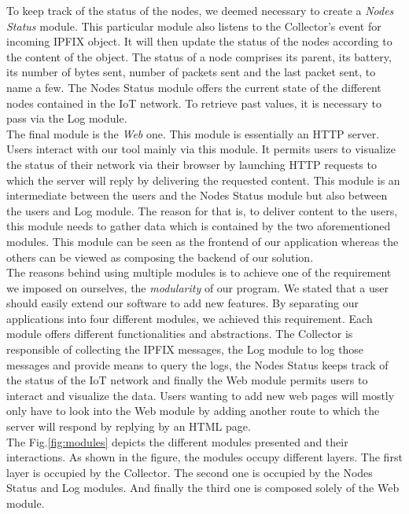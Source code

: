 To keep track of the status of the nodes, we deemed necessary to create a \textit{Nodes Status} module. This particular module also listens to the Collector's event for incoming IPFIX object. It will then update the status of the nodes according to the content of the object. The status of a node comprises its parent, its battery, its number of bytes sent, number of packets sent and the last packet sent, to name a few. The Nodes Status module offers the current state of the different nodes contained in the IoT network. To retrieve past values, it is necessary to pass via the Log module. \\

The final module is the \textit{Web} one. This module is essentially an HTTP server. Users interact with our tool mainly via this module. It permits users to visualize the status of their network via their browser by launching HTTP requests to which the server will reply by delivering the requested content. This module is an intermediate between the users and the Nodes Status module but also between the users and Log module. The reason for that is, to deliver content to the users, this module needs to gather data which is contained by the two aforementioned modules. This module can be seen as the frontend of our application whereas the others can be viewed as composing the backend of our solution.\\

The reasons behind using multiple modules is to achieve one of the requirement we imposed on ourselves, the \textit{modularity} of our program. We stated that a user should easily extend our software to add new features. By separating our applications into four different modules, we achieved this requirement. Each module offers different functionalities and abstractions. The Collector is responsible of collecting the IPFIX messages, the Log module to log those messages and provide means to query the logs, the Nodes Status keeps track of the status of the IoT network and finally the Web module permits users to interact and visualize the data. Users wanting to add new web pages will mostly only have to look into the Web module by adding another route to which the server will respond by replying by an HTML page. \\

The Fig.\ref{fig:modules} depicts the different modules presented and their interactions. As shown in the figure, the modules occupy different layers. The first layer is occupied by the Collector. The second one is occupied by the Nodes Status and Log modules. And finally the third one is composed solely of the Web module.

